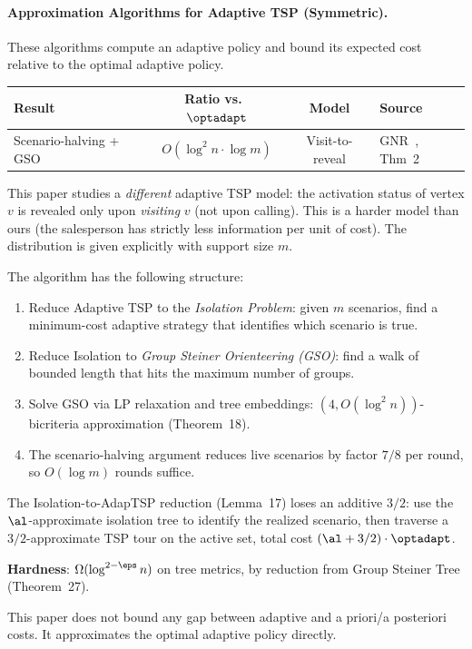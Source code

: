 \paragraph{Approximation Algorithms for Adaptive TSP (Symmetric).}

These algorithms compute an adaptive policy and bound its expected cost relative to the optimal adaptive policy.

\begin{center}
\renewcommand{\arraystretch}{1.4}
\begin{tabular}{l c c l}
    \hline
    \textbf{Result} & \textbf{Ratio vs.\ $\optadapt$} & \textbf{Model} & \textbf{Source} \\
    \hline
    Scenario-halving + GSO & $O(\log^2 n \cdot \log m)$ & Visit-to-reveal & GNR~\cite{GuptaNagarajanRavi2017}, Thm~2 \\
    \hline
\end{tabular}
\end{center}

\begin{remark}
    This paper studies a \emph{different} adaptive TSP model: the activation status of vertex $v$ is revealed only upon \emph{visiting} $v$ (not upon calling). This is a harder model than ours (the salesperson has strictly less information per unit of cost). The distribution is given explicitly with support size $m$.

    The algorithm has the following structure:
    \begin{enumerate}
        \item Reduce Adaptive TSP to the \emph{Isolation Problem}: given $m$ scenarios, find a minimum-cost adaptive strategy that identifies which scenario is true.
        \item Reduce Isolation to \emph{Group Steiner Orienteering (GSO)}: find a walk of bounded length that hits the maximum number of groups.
        \item Solve GSO via LP relaxation and tree embeddings: $(4, O(\log^2 n))$-bicriteria approximation (Theorem~18).
        \item The scenario-halving argument reduces live scenarios by factor $7/8$ per round, so $O(\log m)$ rounds suffice.
    \end{enumerate}

    The Isolation-to-AdapTSP reduction (Lemma~17) loses an additive $3/2$: use the $\al$-approximate isolation tree to identify the realized scenario, then traverse a $3/2$-approximate TSP tour on the active set, total cost $(\al + 3/2) \cdot \optadapt$.

    \textbf{Hardness}: $\Omega(\log^{2-\eps} n)$ on tree metrics, by reduction from Group Steiner Tree (Theorem~27).

    This paper does not bound any gap between adaptive and a priori/a posteriori costs. It approximates the optimal adaptive policy directly.
\end{remark}

